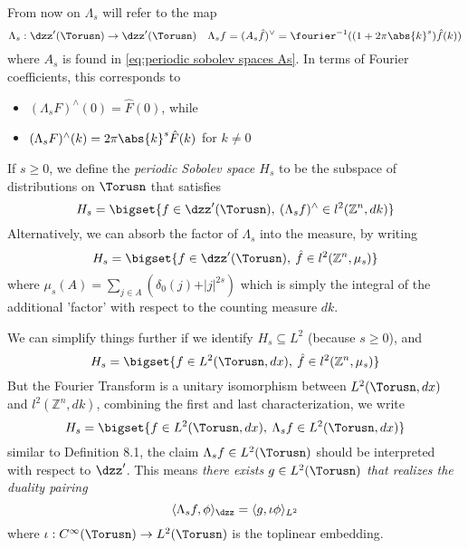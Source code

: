 \documentclass[../main-v2-manifolds.tex]{subfiles}
\begin{document}
\begin{remark}
From now on $\Lambda_s$ will refer to the map
\[
\Lambda_s: \dzz'(\Torusn)\to\dzz'(\Torusn)\quad\Lambda_s f =  (A_s\hat{f})^{\vee} = \fourier^{-1}((1+2\pi \abs{k}^s)\hat{f}(k))
\]
where $A_s$ is found in \cref{eq:periodic sobolev spaces As}. In terms of Fourier coefficients, this corresponds to 
\begin{itemize}
    \item $(\Lambda_s F)^{\wedge}(0) = \hat{F}(0)$, while 
    \item $(\Lambda_s F)^{\wedge}(k) = 2\pi\abs{k}^{s}\hat{F}(k)$ for $k\neq 0$
\end{itemize}
\end{remark}

\begin{definition}
If $s\geq 0$, we define the \emph{periodic Sobolev space $H_s$} to be the subspace of distributions on $\Torusn$ that satisfies 
\[
H_s = \bigset{f\in \dzz'(\Torusn),\: (\Lambda_s f)^{\wedge}\in l^2(\mathbb{Z}^n,dk)}
\]
Alternatively, we can absorb the factor of $\Lambda_s$ into the measure, by writing 
\[
H_s = \bigset{f\in\dzz'(\Torusn),\: \hat{f}\in l^2(\mathbb{Z}^n,\mu_s)}
\]
where $\mu_s(A) = \sum_{j\in A}(\delta_0(j) + \vert j\vert^{2s})$ which is simply the integral of the additional 'factor' with respect to the counting measure $dk$. 
\end{definition}
\begin{remark}
We can simplify things further if we identify $H_s\subseteq L^2$ (because $s\geq 0$), and
\[
H_s = \bigset{f\in L^2(\Torusn,dx),\: \hat{f}\in l^2(\mathbb{Z}^n, \mu_s)}
\]
But the Fourier Transform is a unitary isomorphism between $L^2(\Torusn,dx)$ and $l^2(\mathbb{Z}^n,dk)$, combining the first and last characterization, we write
\[
H_s = \bigset{f\in L^2(\Torusn,dx),\: \Lambda_sf\in L^2(\Torusn,dx)}
\]
similar to Definition 8.1, the claim $\Lambda_s f\in L^2(\Torusn)$ should be interpreted with respect to $\dzz'$. This means \emph{there exists $g\in L^2(\Torusn)$ that realizes the duality pairing}
\[
\langle \Lambda_s f,\phi\rangle_{\dzz}=\langle g,\iota\phi\rangle_{L^2}
\]
where $\iota:C^\infty(\Torusn)\to L^2(\Torusn)$ is the toplinear embedding.
\end{remark}
\end{document}
